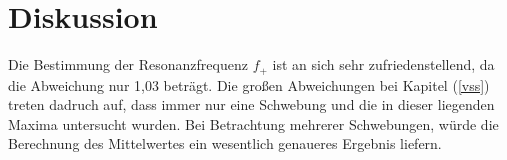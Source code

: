 \section{Diskussion}
\label{sec:Diskussion}
Die Bestimmung der Resonanzfrequenz $f_+$ ist an sich sehr zufriedenstellend, da die Abweichung nur 1,03\text{\%} beträgt.
Die großen Abweichungen bei Kapitel (\ref{vss}) treten dadruch auf, dass immer nur eine Schwebung und die in dieser liegenden Maxima untersucht wurden. Bei Betrachtung mehrerer Schwebungen, würde die Berechnung des Mittelwertes
ein wesentlich genaueres Ergebnis liefern.
